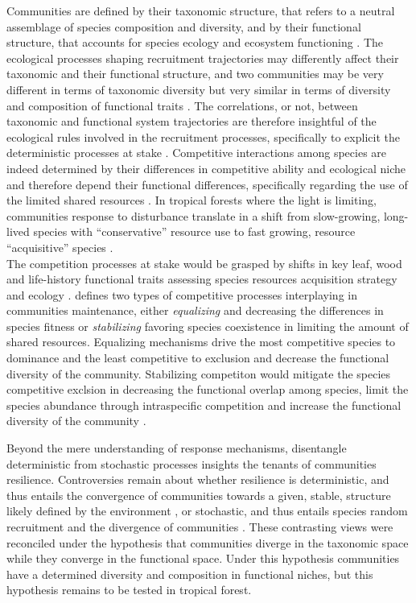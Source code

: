 \documentclass[fleqn,10pt]{ArtEcoFoG} %
\begin{document}
Communities are defined by their taxonomic structure, that refers to a
neutral assemblage of species composition and diversity, and by their
functional structure, that accounts for species ecology and ecosystem
functioning \citep{Violle2007b, Kunstler2016}. The ecological processes
shaping recruitment trajectories may differently affect their taxonomic
and their functional structure, and two communities may be very
different in terms of taxonomic diversity but very similar in terms of
diversity and composition of functional traits \citep{Villeger2012}. The
correlations, or not, between taxonomic and functional system
trajectories are therefore insightful of the ecological rules involved
in the recruitment processes, specifically to explicit the deterministic
processes at stake \citep{Mayfield2010, Fukami2005}. Competitive
interactions among species are indeed determined by their differences in
competitive ability and ecological niche and therefore depend their
functional differences, specifically regarding the use of the limited
shared resources \citep{Webb2002, Perronne2017}. In tropical forests
where the light is limiting, communities response to disturbance
translate in a shift from slow-growing, long-lived species with
``conservative'' resource use to fast growing, resource ``acquisitive''
species \citep{Denslow1980, Molino2001, Bongers2009}.\\
The competition processes at stake would be grasped by shifts in key
leaf, wood and life-history functional traits assessing species
resources acquisition strategy and ecology
\citep{Wright2004, Chave2009b, Herault2011, Gerhold2015}.
\citep{Chesson2000} defines two types of competitive processes
interplaying in communities maintenance, either \emph{equalizing} and
decreasing the differences in species fitness or \emph{stabilizing}
favoring species coexistence in limiting the amount of shared resources.
Equalizing mechanisms drive the most competitive species to dominance
and the least competitive to exclusion and decrease the functional
diversity of the community. Stabilizing competiton would mitigate the
species competitive exclsion in decreasing the functional overlap among
species, limit the species abundance through intraspecific competition
and increase the functional diversity of the community
\citep{Ackerly2003, McGill2006, Kunstler2012}.

Beyond the mere understanding of response mechanisms, disentangle
deterministic from stochastic processes insights the tenants of
communities resilience. Controversies remain about whether resilience is
deterministic, and thus entails the convergence of communities towards a
given, stable, structure likely defined by the environment
\citep{Clements1916}, or stochastic, and thus entails species random
recruitment and the divergence of communities \citep{Diamond1975}. These
contrasting views were reconciled under the hypothesis that communities
diverge in the taxonomic space while they converge in the functional
space. Under this hypothesis communities have a determined diversity and
composition in functional niches, but this hypothesis remains to be
tested in tropical forest.
\end{document}
